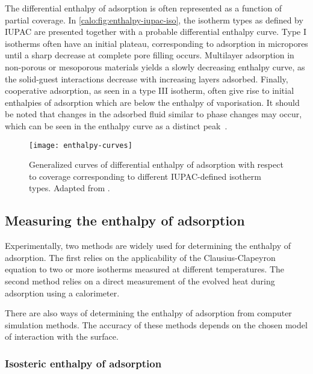 The differential enthalpy of adsorption is often represented as a
function of partial coverage. In \autoref{calo:fig:enthalpy-iupac-iso},
the isotherm types as defined by IUPAC are presented together with
a probable differential enthalpy curve. Type I isotherms often 
have an initial plateau, corresponding to adsorption in micropores
until a sharp decrease at complete pore filling occurs. Multilayer
adsorption in non-porous or mesoporous materials yields a slowly
decreasing enthalpy curve, as the solid-guest interactions decrease
with increasing layers adsorbed. Finally, cooperative adsorption,
as seen in a type III isotherm, often give rise to initial enthalpies
of adsorption which are below the enthalpy of vaporisation.
It should be noted that changes in the adsorbed fluid similar 
to phase changes may occur, which can be seen in the enthalpy curve
as a distinct peak~\cite{llewellynAdsorptionMFItypeZeolites1993, %
llewellynAdsorptionMFItypeZeolites1993a}.

\begin{figure}[htb]
  \centering

  \texttt{[image: enthalpy-curves]}
  \caption{
    Generalized curves of differential enthalpy of adsorption with 
    respect to coverage corresponding to different 
    IUPAC-defined isotherm types.
    Adapted from \citeauthor{llewellynGasAdsorptionMicrocalorimetry2005}%
    \cite{llewellynGasAdsorptionMicrocalorimetry2005}.
  }%
  \label{calo:fig:enthalpy-iupac-iso}

\end{figure}


\subsection{Measuring the enthalpy of adsorption}

Experimentally, two methods are widely used for determining the 
enthalpy of adsorption. The first relies on the applicability of the 
Clausius-Clapeyron equation to two or more isotherms measured 
at different temperatures. The second method relies on a 
direct measurement of the evolved heat during adsorption 
using a calorimeter.

There are also ways of determining the enthalpy of adsorption
from computer simulation methods. The accuracy of these methods
depends on the chosen model of interaction with the surface.

\subsubsection{Isosteric enthalpy of adsorption}

